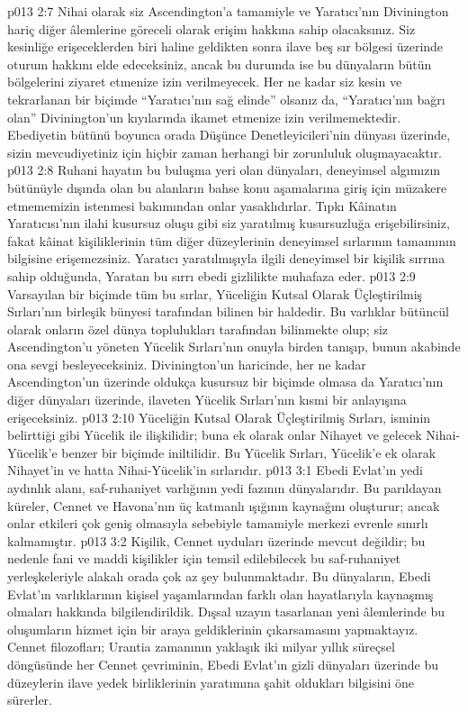 \vs p013 2:7 Nihai olarak siz Ascendington’a tamamiyle ve Yaratıcı’nın Divinington hariç diğer âlemlerine göreceli olarak erişim hakkına sahip olacaksınız. Siz kesinliğe erişeceklerden biri haline geldikten sonra ilave beş sır bölgesi üzerinde oturum hakkını elde edeceksiniz, ancak bu durumda ise bu dünyaların bütün bölgelerini ziyaret etmenize izin verilmeyecek. Her ne kadar siz kesin ve tekrarlanan bir biçimde “Yaratıcı’nın sağ elinde” olsanız da, “Yaratıcı’nın bağrı olan” Divinington’un kıyılarında ikamet etmenize izin verilmemektedir. Ebediyetin bütünü boyunca orada Düşünce Denetleyicileri’nin dünyası üzerinde, sizin mevcudiyetiniz için hiçbir zaman herhangi bir zorunluluk oluşmayacaktır.
\vs p013 2:8 Ruhani hayatın bu buluşma yeri olan dünyaları, deneyimsel algımızın bütünüyle dışında olan bu alanların bahse konu aşamalarına giriş için müzakere etmememizin istenmesi bakımından onlar yasaklıdırlar. Tıpkı Kâinatın Yaratıcısı’nın ilahi kusursuz oluşu gibi siz yaratılmış kusursuzluğa erişebilirsiniz, fakat kâinat kişiliklerinin tüm diğer düzeylerinin deneyimsel sırlarının tamamının bilgisine erişemezsiniz. Yaratıcı yaratılmışıyla ilgili deneyimsel bir kişilik sırrına sahip olduğunda, Yaratan bu sırrı ebedi gizlilikte muhafaza eder.
\vs p013 2:9 Varsayılan bir biçimde tüm bu sırlar, Yüceliğin Kutsal Olarak Üçleştirilmiş Sırları’nın birleşik bünyesi tarafından bilinen bir haldedir. Bu varlıklar bütüncül olarak onların özel dünya toplulukları tarafından bilinmekte olup; siz Ascendington’u yöneten Yücelik Sırları’nın onuyla birden tanışıp, bunun akabinde ona sevgi besleyeceksiniz. Divinington’un haricinde, her ne kadar Ascendington’un üzerinde oldukça kusursuz bir biçimde olmasa da Yaratıcı’nın diğer dünyaları üzerinde, ilaveten Yücelik Sırları’nın kısmi bir anlayışına erişeceksiniz.
\vs p013 2:10 Yüceliğin Kutsal Olarak Üçleştirilmiş Sırları, isminin belirttiği gibi Yücelik ile ilişkilidir; buna ek olarak onlar Nihayet ve gelecek Nihai\hyp{}Yücelik’e benzer bir biçimde iniltilidir. Bu Yücelik Sırları, Yücelik’e ek olarak Nihayet’in ve hatta Nihai\hyp{}Yücelik’in sırlarıdır.
\vs p013 3:1 Ebedi Evlat’ın yedi aydınlık alanı, saf\hyp{}ruhaniyet varlığının yedi fazının dünyalarıdır. Bu parıldayan küreler, Cennet ve Havona’nın üç katmanlı ışığının kaynağını oluşturur; ancak onlar etkileri çok geniş olmasıyla sebebiyle tamamiyle merkezi evrenle sınırlı kalmamıştır.
\vs p013 3:2 Kişilik, Cennet uyduları üzerinde mevcut değildir; bu nedenle fani ve maddi kişilikler için temsil edilebilecek bu saf\hyp{}ruhaniyet yerleşkeleriyle alakalı orada çok az şey bulunmaktadır. Bu dünyaların, Ebedi Evlat’ın varlıklarının kişisel yaşamlarından farklı olan hayatlarıyla kaynaşmış olmaları hakkında bilgilendirildik. Dışsal uzayın tasarlanan yeni âlemlerinde bu oluşumların hizmet için bir araya geldiklerinin çıkarsamasını yapmaktayız. Cennet filozofları; Urantia zamanının yaklaşık iki milyar yıllık süreçsel döngüsünde her Cennet çevriminin, Ebedi Evlat’ın gizli dünyaları üzerinde bu düzeylerin ilave yedek birliklerinin yaratımına şahit oldukları bilgisini öne sürerler.
